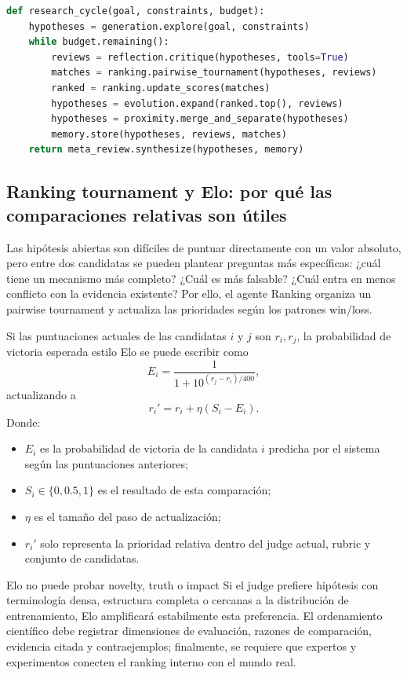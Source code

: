\begin{lstlisting}[language=Python,caption={Ciclo conceptual Generate--debate--evolve}]
def research_cycle(goal, constraints, budget):
    hypotheses = generation.explore(goal, constraints)
    while budget.remaining():
        reviews = reflection.critique(hypotheses, tools=True)
        matches = ranking.pairwise_tournament(hypotheses, reviews)
        ranked = ranking.update_scores(matches)
        hypotheses = evolution.expand(ranked.top(), reviews)
        hypotheses = proximity.merge_and_separate(hypotheses)
        memory.store(hypotheses, reviews, matches)
    return meta_review.synthesize(hypotheses, memory)
\end{lstlisting}

\subsection{Ranking tournament y Elo: por qué las comparaciones relativas son útiles}

Las hipótesis abiertas son difíciles de puntuar directamente con un valor absoluto, pero entre dos candidatas se pueden plantear preguntas más específicas: ¿cuál tiene un mecanismo más completo? ¿Cuál es más falsable? ¿Cuál entra en menos conflicto con la evidencia existente? Por ello, el agente Ranking organiza un pairwise tournament y actualiza las prioridades según los patrones win/loss.

Si las puntuaciones actuales de las candidatas $i$ y $j$ son $r_i,r_j$, la probabilidad de victoria esperada estilo Elo se puede escribir como
$$
E_i=\frac{1}{1+10^{(r_j-r_i)/400}},
$$
actualizando a
$$
r_i' = r_i + \eta(S_i-E_i).
$$
Donde:
\begin{itemize}
  \item $E_i$ es la probabilidad de victoria de la candidata $i$ predicha por el sistema según las puntuaciones anteriores;
  \item $S_i\in\{0,0.5,1\}$ es el resultado de esta comparación;
  \item $\eta$ es el tamaño del paso de actualización;
  \item $r_i'$ solo representa la prioridad relativa dentro del judge actual, rubric y conjunto de candidatas.
\end{itemize}

\begin{warningbox}{Elo no puede probar novelty, truth o impact}
Si el judge prefiere hipótesis con terminología densa, estructura completa o cercanas a la distribución de entrenamiento, Elo amplificará estabilmente esta preferencia. El ordenamiento científico debe registrar dimensiones de evaluación, razones de comparación, evidencia citada y contraejemplos; finalmente, se requiere que expertos y experimentos conecten el ranking interno con el mundo real.
\end{warningbox}

